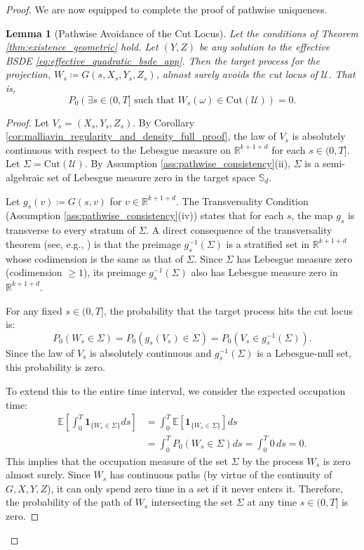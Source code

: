 \documentclass[12pt, letterpaper]{amsart}
\newcommand{\Ucal}{\mathcal{U}}
\newcommand{\Sd}{\mathbb{S}_d}
\newcommand{\R}{\mathbb{R}}
\theoremstyle{plain}
\newtheorem{lemma}[theorem]{Lemma}
\theoremstyle{definition}
\theoremstyle{remark}
\numberwithin{equation}{section} %
\begin{document}
\begin{proof}
We are now equipped to complete the proof of pathwise uniqueness.

\begin{lemma}[Pathwise Avoidance of the Cut Locus]
\label{lem:local_time_full_proof}
Let the conditions of Theorem \ref{thm:existence_geometric} hold. Let $(Y,Z)$ be any solution to the effective BSDE \eqref{eq:effective_quadratic_bsde_app}. Then the target process for the projection, $W_s \coloneqq G(s, X_s, Y_s, Z_s)$, almost surely avoids the cut locus of $\Ucal$. That is,
\[ P_0\left(\exists s \in (0,T] \text{ such that } W_s(\omega) \in \mathrm{Cut}(\Ucal)\right) = 0. \]
\end{lemma}
\begin{proof}
Let $V_s = (X_s, Y_s, Z_s)$. By Corollary \ref{cor:malliavin_regularity_and_density_full_proof}, the law of $V_s$ is absolutely continuous with respect to the Lebesgue measure on $\R^{k+1+d}$ for each $s \in (0,T]$.
Let $\Sigma = \mathrm{Cut}(\Ucal)$. By Assumption \ref{ass:pathwise_consistency}(ii), $\Sigma$ is a semi-algebraic set of Lebesgue measure zero in the target space $\Sd$.

Let $g_s(v) \coloneqq G(s,v)$ for $v \in \R^{k+1+d}$. The Transversality Condition (Assumption \ref{ass:pathwise_consistency}(iv)) states that for each $s$, the map $g_s$ is transverse to every stratum of $\Sigma$. A direct consequence of the transversality theorem (see, e.g., \cite[Chapter 3, \S 2, Corollary 1]{GuilleminPollack1974}) is that the preimage $g_s^{-1}(\Sigma)$ is a stratified set in $\R^{k+1+d}$ whose codimension is the same as that of $\Sigma$. Since $\Sigma$ has Lebesgue measure zero (codimension $\ge 1$), its preimage $g_s^{-1}(\Sigma)$ also has Lebesgue measure zero in $\R^{k+1+d}$.

For any fixed $s \in (0,T]$, the probability that the target process hits the cut locus is:
\[ P_0(W_s \in \Sigma) = P_0(g_s(V_s) \in \Sigma) = P_0(V_s \in g_s^{-1}(\Sigma)). \]
Since the law of $V_s$ is absolutely continuous and $g_s^{-1}(\Sigma)$ is a Lebesgue-null set, this probability is zero.

To extend this to the entire time interval, we consider the expected occupation time:
\begin{align*}
    \mathbb{E}\left[ \int_0^T \mathbf{1}_{\{W_s \in \Sigma\}} ds \right] &= \int_0^T \mathbb{E}\left[ \mathbf{1}_{\{W_s \in \Sigma\}} \right] ds \\
    &= \int_0^T P_0(W_s \in \Sigma) ds = \int_0^T 0 \, ds = 0.
\end{align*}
This implies that the occupation measure of the set $\Sigma$ by the process $W_s$ is zero almost surely. Since $W_s$ has continuous paths (by virtue of the continuity of $G, X, Y, Z$), it can only spend zero time in a set if it never enters it. Therefore, the probability of the path of $W_s$ intersecting the set $\Sigma$ at any time $s \in (0,T]$ is zero.
\end{proof}


\end{proof}
\end{document}
